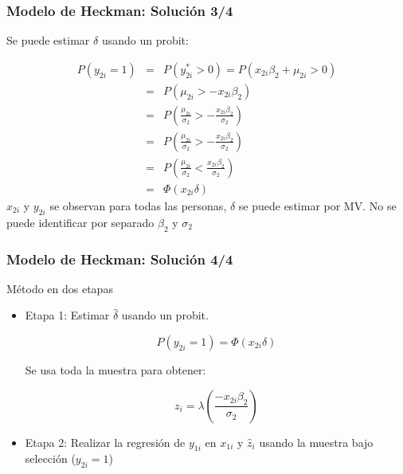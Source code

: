 \begin{frame}[fragile]
	\frametitle{Modelo de Heckman: Solución 3/4}
	
	Se puede estimar $\delta$ usando un probit:
	
	\begin{eqnarray}
		P(y_{2i}=1) &=& P(y_{2i}^*>0)= P(x_{2i}\beta_2+\mu_{2i}>0)  \\
		&=& P(\mu_{2i}> -x_{2i}\beta_2) \\
		&=& P(\frac{\mu_{2i}}{\sigma_2}>- \frac{x_{2i}\beta_2}{\sigma_2}) \\
		&=& P(\frac{\mu_{2i}}{\sigma_2}>- \frac{x_{2i}\beta_2}{\sigma_2}) \\                       	                       			  &=& P(\frac{\mu_{2i}}{\sigma_2}< \frac{x_{2i}\beta_2}{\sigma_2})  \\
		&=& \Phi(x_{2i}\delta)                 
	\end{eqnarray}
	$x_{2i}$ y $y_{2i}$ se observan para todas las personas, $\delta$ se puede estimar por MV. No se puede identificar por separado $\beta_2$ y $\sigma_2$
\end{frame}
\begin{frame}[fragile]
	\frametitle{Modelo de Heckman: Solución 4/4}
	
	Método en dos etapas 
	
	\begin{itemize}
		\item Etapa 1: Estimar $\hat\delta$ usando un probit.
		
		$$P(y_{2i}=1)=\Phi(x_{2i}\delta)$$
		
		Se usa toda la muestra para obtener:
		
		$$z_i= \lambda(\frac{-x_{2i}\beta_2}{\sigma_2})$$
		
		\item Etapa 2: Realizar la regresión de $y_{1i}$ en $x_{1i}$ y $\hat z_i$ usando la muestra bajo selección ($y_{2i}=1$)
		
	\end{itemize}
	
\end{frame}
